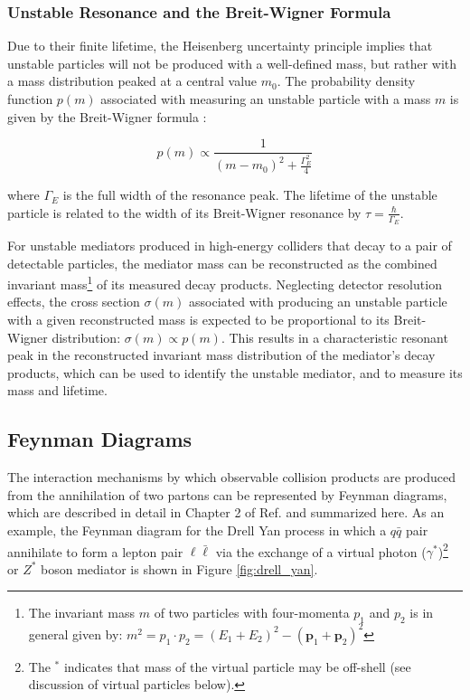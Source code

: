 
\subsubsection{Unstable Resonance and the Breit-Wigner Formula}

Due to their finite lifetime, the Heisenberg uncertainty principle implies that unstable particles will not be produced with a well-defined mass, but rather with a mass distribution peaked at a central value \(m_0\). The probability density function \(p(m)\) associated with measuring an unstable particle with a mass \(m\) is given by the Breit-Wigner formula \cite{breit_wigner}:

\begin{equation}
\label{eq:breit_wigner}
p(m) \propto \frac{1}{(m-m_0)^2 + \frac{\Gamma_E^2}{4}}
\end{equation}

\noindent where \(\Gamma_E\) is the full width of the resonance peak. The lifetime of the unstable particle is related to the width of its Breit-Wigner resonance by \(\tau = \frac{\hbar}{\Gamma_E}\).

For unstable mediators produced in high-energy colliders that decay to a pair of detectable particles, the mediator mass can be reconstructed as the combined invariant mass\footnote{The invariant mass \(m\) of two particles with four-momenta \(p_1\) and \(p_2\) is in general given by: \(m^2 = p_1 \cdot p_2 = (E_1+E_2)^2 - (\mathbf{p}_1+\mathbf{p}_2)^2\)} of its measured decay products. Neglecting detector resolution effects, the cross section \(\sigma(m)\) associated with producing an unstable particle with a given reconstructed mass is expected to be proportional to its Breit-Wigner distribution: \(\sigma(m)\propto p(m)\). This results in a characteristic resonant peak in the reconstructed invariant mass distribution of the mediator's decay products, which can be used to identify the unstable mediator, and to measure its mass and lifetime.

\subsection{Feynman Diagrams}

The interaction mechanisms by which observable collision products are produced from the annihilation of two partons can be represented by Feynman diagrams, which are described in detail in Chapter 2 of Ref. \cite{griffiths_2008} and summarized here. As an example, the Feynman diagram for the Drell Yan process in which a \(q\bar{q}\) pair annihilate to form a lepton pair \(\ell\bar{\ell}\) via the exchange of a virtual photon (\(\gamma^{*}\))\footnote{The \(^{*}\) indicates that mass of the virtual particle may be off-shell (see discussion of virtual particles below).} or \(Z^{*}\) boson mediator is shown in Figure \ref{fig:drell_yan}. 

